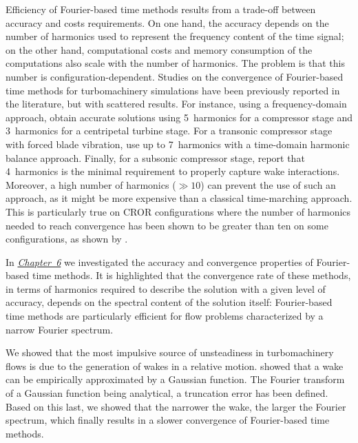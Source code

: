 Efficiency of Fourier-based time methods results 
from a trade-off between accuracy and 
costs requirements.
On one hand, the accuracy depends on the number of harmonics
used to represent the frequency content of the time 
signal; on the other hand, computational costs and 
memory consumption of the computations also scale
with the number of harmonics. 
The problem is that this number is 
configuration-dependent. 
Studies on the convergence of 
Fourier-based time methods for turbomachinery simulations 
have been previously reported in the literature, but with scattered results. 
For instance, using a frequency-domain approach, 
\citet{Vilmin2006} obtain accurate solutions 
using 5~harmonics for a compressor stage and 3~harmonics for a 
centripetal turbine stage. For a transonic compressor stage with 
forced blade vibration, \citet{ekici2010} use 
up to 7~harmonics with a time-domain harmonic balance approach. Finally, for a 
subsonic compressor stage, \citet{JSicot2012} report 
that 4~harmonics is the minimal requirement to properly capture wake interactions.
Moreover, a high number of harmonics
($\gg 10$) can prevent the use of such an approach,
as it might be more expensive than a classical time-marching approach.
This is particularly true on CROR configurations where the number
of harmonics needed to reach convergence
has been shown to be greater than ten
on some configurations, as shown by \citet{ThesisFrancois}.

In \hyperref[cha:limitations_convergence]{\emph{Chapter~6}}
we investigated the accuracy and convergence properties 
of Fourier-based time methods. It is highlighted that the convergence rate 
of these methods, in terms of harmonics required to describe the solution 
with a given level of accuracy, depends on the spectral content of the 
solution itself: Fourier-based time methods are particularly efficient 
for flow problems characterized by a narrow Fourier 
spectrum. 

We showed that the most impulsive source of unsteadiness in 
turbomachinery flows is due to the generation of wakes in 
a relative motion.
\citet{Lakshminarayana1980} showed that a wake
can be empirically approximated by a Gaussian function.
The Fourier transform of a Gaussian function being analytical,
a truncation error has been defined.
Based on this last, we showed that the narrower the wake, 
the larger the Fourier spectrum, 
which finally results in a slower convergence 
of Fourier-based time methods.

